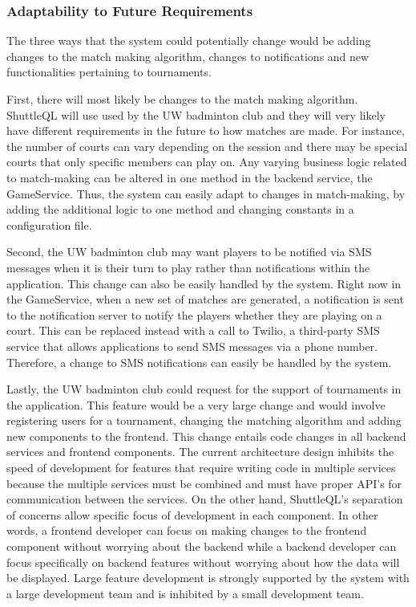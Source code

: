 \documentclass{article}
\begin{document}
\subsubsection{Adaptability to Future Requirements}
The three ways that the system could potentially change would be adding changes to the match making algorithm, changes to notifications and new functionalities pertaining to tournaments.

First, there will most likely be changes to the match making algorithm. ShuttleQL will use used by the UW badminton club and they will very likely have different requirements in the future to how matches are made. For instance, the number of courts can vary depending on the session and there may be special courts that only specific members can play on. Any varying business logic related to match-making can be altered in one method in the backend service, the GameService. Thus, the system can easily adapt to changes in match-making, by adding the additional logic to one method and changing constants in a configuration file.

Second, the UW badminton club may want players to be notified via SMS messages when it is their turn to play rather than notifications within the application. This change can also be easily handled by the system. Right now in the GameService, when a new set of matches are generated, a notification is sent to the notification server to notify the players whether they are playing on a court. This can be replaced instead with a call to Twilio, a third-party SMS service that allows applications to send SMS messages via a phone number. Therefore, a change to SMS notifications can easily be handled by the system.

Lastly, the UW badminton club could request for the support of tournaments in the application. This feature would be a very large change and would involve registering users for a tournament, changing the matching algorithm and adding new components to the frontend. This change entails code changes in all backend services and frontend components. The current architecture design inhibits the speed of development for features that require writing code in multiple services because the multiple services must be combined and must have proper API’s for communication between the services. On the other hand, ShuttleQL’s separation of concerns allow specific focus of development in each component. In other words, a frontend developer can focus on making changes to the frontend component without worrying about the backend while a backend developer can focus specifically on backend features without worrying about how the data will be displayed. Large feature development is strongly supported by the system with a large development team and is inhibited by a small development team.
\end{document}
